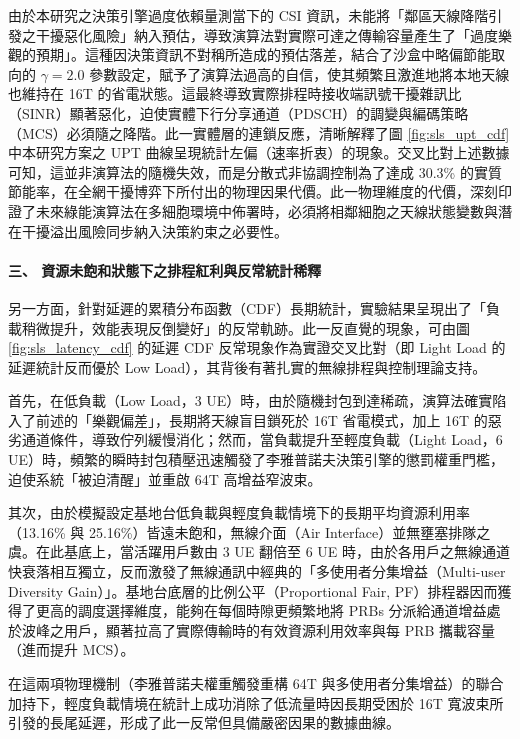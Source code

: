 由於本研究之決策引擎過度依賴量測當下的 CSI 資訊，未能將「鄰區天線降階引發之干擾惡化風險」納入預估，導致演算法對實際可達之傳輸容量產生了「過度樂觀的預期」。這種因決策資訊不對稱所造成的預估落差，結合了沙盒中略偏節能取向的 $\gamma = 2.0$ 參數設定，賦予了演算法過高的自信，使其頻繁且激進地將本地天線也維持在 16T 的省電狀態。這最終導致實際排程時接收端訊號干擾雜訊比（SINR）顯著惡化，迫使實體下行分享通道（PDSCH）的調變與編碼策略（MCS）必須隨之降階。此一實體層的連鎖反應，清晰解釋了圖 \ref{fig:sls_upt_cdf} 中本研究方案之 UPT 曲線呈現統計左偏（速率折衷）的現象。交叉比對上述數據可知，這並非演算法的隨機失效，而是分散式非協調控制為了達成 30.3\% 的實質節能率，在全網干擾博弈下所付出的物理因果代價。此一物理維度的代價，深刻印證了未來綠能演算法在多細胞環境中佈署時，必須將相鄰細胞之天線狀態變數與潛在干擾溢出風險同步納入決策約束之必要性。

\paragraph{三、 資源未飽和狀態下之排程紅利與反常統計稀釋} 
另一方面，針對延遲的累積分布函數（CDF）長期統計，實驗結果呈現出了「負載稍微提升，效能表現反倒變好」的反常軌跡。此一反直覺的現象，可由圖 \ref{fig:sls_latency_cdf} 的延遲 CDF 反常現象作為實證交叉比對（即 Light Load 的延遲統計反而優於 Low Load），其背後有著扎實的無線排程與控制理論支持。

首先，在低負載（Low Load，3 UE）時，由於隨機封包到達稀疏，演算法確實陷入了前述的「樂觀偏差」，長期將天線盲目鎖死於 16T 省電模式，加上 16T 的惡劣通道條件，導致佇列緩慢消化；然而，當負載提升至輕度負載（Light Load，6 UE）時，頻繁的瞬時封包積壓迅速觸發了李雅普諾夫決策引擎的懲罰權重門檻，迫使系統「被迫清醒」並重啟 64T 高增益窄波束。

其次，由於模擬設定基地台低負載與輕度負載情境下的長期平均資源利用率（13.16\% 與 25.16\%）皆遠未飽和，無線介面（Air Interface）並無壅塞排隊之虞。在此基底上，當活躍用戶數由 3 UE 翻倍至 6 UE 時，由於各用戶之無線通道快衰落相互獨立，反而激發了無線通訊中經典的「多使用者分集增益（Multi-user Diversity Gain）」。基地台底層的比例公平（Proportional Fair, PF）排程器因而獲得了更高的調度選擇維度，能夠在每個時隙更頻繁地將 PRBs 分派給通道增益處於波峰之用戶，顯著拉高了實際傳輸時的有效資源利用效率與每 PRB 攜載容量（進而提升 MCS）。

在這兩項物理機制（李雅普諾夫權重觸發重構 64T 與多使用者分集增益）的聯合加持下，輕度負載情境在統計上成功消除了低流量時因長期受困於 16T 寬波束所引發的長尾延遲，形成了此一反常但具備嚴密因果的數據曲線。

